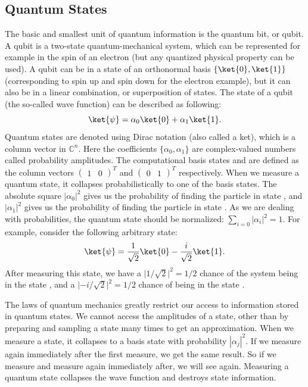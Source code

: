 \documentclass[a4paper,10pt]{article}
\begin{document}
\subsection{Quantum States}
The basic and smallest unit of quantum information is the quantum bit, or qubit.
A qubit is a two-state quantum-mechanical system, which can be represented for example in the spin of an electron (but any quantized physical property can be used).
A qubit can be in a state of an orthonormal basis $\{\ket{0}, \ket{1}\}$ (corresponding to spin up and spin down for the electron example), but it can also be in a linear combination, or superposition of states.
The state of a qubit (the so-called wave function) can be described as following:
\begin{equation}
\ket{\psi} = \alpha_0\ket{0} + \alpha_1\ket{1}.
\end{equation}
Quantum states are denoted using Dirac notation \ket{\,\cdotp\,} (also called a ket), which is a column vector in $\mathbb{C}^n$.
Here the coefficients $\{\alpha_0, \alpha_1\}$ are complex-valued numbers called probability amplitudes.
The computational basis states  and  are defined as the column vectors $(\begin{matrix}1 & 0\end{matrix})^T$ and $(\begin{matrix}0 & 1\end{matrix})^T$ respectively.
When we measure a quantum state, it collapses probabilistically to one of the basis states.
The absolute square $|\alpha_0|^2$ gives us the probability of finding the particle in state , and $|\alpha_1|^2$ gives us the probability of finding the particle in state .
As we are dealing with probabilities, the quantum state should be normalized: $\sum_{i=0}|\alpha_i|^2 = 1$.
For example, consider the following arbitrary state:
\begin{equation} \label{eq:arbitary_state_example}
\ket{\psi} = \dfrac{1}{\sqrt2}\ket{0} - \dfrac{i}{\sqrt2}\ket{1}.
\end{equation}
After measuring this state, we have a $\lvert1/\sqrt2\rvert^2 = 1/2$ chance of the system being in the state , and a $\lvert{-}i/\sqrt2\rvert^2 = 1/2$ chance of being in the state .

The laws of quantum mechanics greatly restrict our access to information stored in quantum states.
We cannot access the amplitudes of a state, other than by preparing and sampling a state many times to get an approximation. 
When we measure a state, it collapses to a basis state  with probability $|\alpha_j|^2$.
If we measure again immediately after the first measure, we get the same result.
So if we measure  and measure again immediately after, we will see  again.
Measuring a quantum state collapses the wave function and destroys state information.
\end{document}
